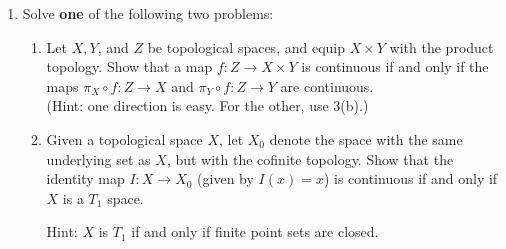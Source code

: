 \documentclass[12pt]{article}
\newcommand{\points}[1]{\marginpar{\hspace{24pt}[#1]}}
\begin{document}
\begin{enumerate}
\item Solve {\bf one} of the following two problems:\points{6}
\begin{enumerate}
\item Let $X, Y$, and $Z$ be topological spaces, and equip $X\times Y$ with the product topology. Show that a map $f:Z\to X\times Y$ is continuous if and only if the maps $\pi_X\circ f:Z\to X$ and $\pi_Y\circ f:Z\to Y$ are continuous.  \\(Hint: one direction is easy. For the other, use 3(b).)

\item Given a topological space $X$, let $X_0$ denote the space with the same underlying set as $X$, but with the cofinite topology. Show that the identity map $I:X\to X_0$ (given by $I(x)=x$) is continuous if and only if $X$ is a $T_1$ space.

Hint: $X$ is $T_1$ if and only if finite point sets are closed.
\end{enumerate}
\end{enumerate}
\end{document}
